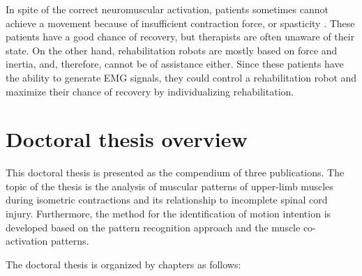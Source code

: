 In spite of the correct neuromuscular activation, patients sometimes cannot achieve a movement because of insufficient contraction force, or spasticity \citep{Liu2016b}. These patients have a good chance of recovery, but therapists are often unaware of their state. On the other hand, rehabilitation robots are mostly based on force and inertia, and, therefore, cannot be of assistance either. Since these patients have the ability to generate EMG signals, they could control a rehabilitation robot and maximize their chance of recovery by individualizing rehabilitation.




\section {Doctoral thesis overview}

This doctoral thesis is presented as the compendium of three publications. The topic of the thesis is the analysis of muscular patterns of upper-limb muscles during isometric contractions and its relationship to incomplete spinal cord injury. Furthermore, the method for the identification of motion intention is developed based on the pattern recognition approach and the muscle co-activation patterns. 

The doctoral thesis is organized by chapters as follows:

